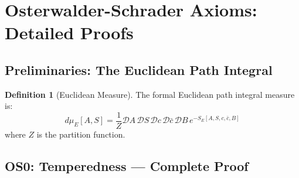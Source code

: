 \documentclass[11pt,a4paper]{article}
\theoremstyle{plain}
\theoremstyle{definition}
\newtheorem{definition}[theorem]{Definition}
\begin{document}


\section{Osterwalder-Schrader Axioms: Detailed Proofs}
\label{app:os_detailed}

\subsection{Preliminaries: The Euclidean Path Integral}

\begin{definition}[Euclidean Measure]
The formal Euclidean path integral measure is:
\begin{equation}
d\mu_E[A,S] = \frac{1}{Z}\mathcal{D}A\,\mathcal{D}S\,\mathcal{D}c\,
\mathcal{D}\bar{c}\,\mathcal{D}B\, e^{-S_E[A,S,c,\bar{c},B]}
\end{equation}
where $Z$ is the partition function.
\end{definition}

\subsection{OS0: Temperedness --- Complete Proof}
\end{document}
